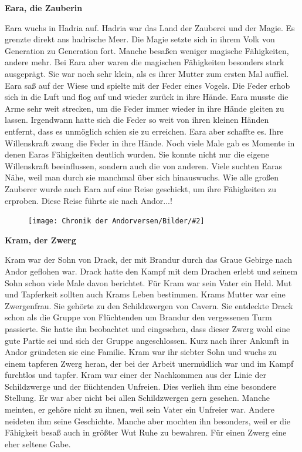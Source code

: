 \documentclass[10pt, a4paper, oneside]{book}
\newcommand{\bildlinks}[2][height=0.32\textwidth,width=0.48\textwidth,keepaspectratio]{%
    \begin{figure}
        \texttt{[image: Chronik der Andorversen/Bilder/\#2]}
    \end{figure}
}
\begin{document}
\begin{multicols}{2}
\textbf{Eara, die Zauberin}

Eara wuchs in Hadria auf. Hadria war das Land der Zauberei und der Magie. Es grenzte direkt ans hadrische Meer. Die Magie setzte sich in ihrem Volk von Generation zu Generation fort. Manche besaßen weniger magische Fähigkeiten, andere mehr. Bei Eara aber waren die magischen Fähigkeiten besonders stark ausgeprägt. Sie war noch sehr klein, als es ihrer Mutter zum ersten Mal auffiel. Eara saß auf der Wiese und spielte mit der Feder eines Vogels. Die Feder erhob sich in die Luft und flog auf und wieder zurück in ihre Hände.  Eara musste die Arme sehr weit strecken, um die Feder immer wieder in ihre Hände gleiten zu lassen. Irgendwann hatte sich die Feder so weit von ihren kleinen Händen entfernt, dass es unmöglich schien sie zu erreichen. Eara aber schaffte es. Ihre Willenskraft zwang die Feder in ihre Hände. Noch viele Male gab es Momente in denen Earas Fähigkeiten deutlich wurden. Sie konnte nicht nur die eigene Willenskraft beeinflussen, sondern auch die von anderen. Viele suchten Earas Nähe, weil man durch sie manchmal über sich hinauswuchs. Wie alle großen Zauberer wurde auch Eara auf eine Reise geschickt, um ihre Fähigkeiten zu erproben. Diese Reise führte sie nach Andor...!\bigskip


\bildlinks[width=0.1\textwidth]{Die Helden Kram.jpg}

\textbf{Kram, der Zwerg}

Kram war der Sohn von Drack, der mit Brandur durch das Graue Gebirge nach Andor geflohen war. Drack hatte den Kampf mit dem Drachen erlebt und seinem Sohn schon viele Male davon berichtet. Für Kram war sein Vater ein Held. Mut und Tapferkeit sollten auch Krams Leben bestimmen. Krams Mutter war eine Zwergenfrau. Sie gehörte zu den Schildzwergen von Cavern. Sie entdeckte Drack schon als die Gruppe von Flüchtenden um Brandur den vergessenen Turm passierte. Sie hatte ihn beobachtet und eingesehen, dass dieser Zwerg wohl eine gute Partie sei und sich der Gruppe angeschlossen. Kurz nach ihrer Ankunft in Andor gründeten sie eine Familie. Kram war ihr siebter Sohn und wuchs zu einem tapferen Zwerg heran, der bei der Arbeit unermüdlich war und im Kampf furchtlos und tapfer. Kram war einer der Nachkommen aus der Linie der Schildzwerge und der flüchtenden Unfreien. Dies verlieh ihm eine besondere Stellung. Er war aber nicht bei allen Schildzwergen gern gesehen. Manche meinten, er gehöre nicht zu ihnen, weil sein Vater ein Unfreier war. Andere neideten ihm seine Geschichte. Manche aber mochten ihn besonders, weil er die Fähigkeit besaß auch in größter Wut Ruhe zu bewahren. Für einen Zwerg eine eher seltene Gabe.\bigskip




\end{multicols}
\end{document}
